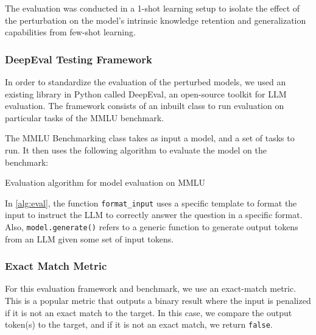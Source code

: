 The evaluation was conducted in a 1-shot learning setup to isolate the effect of the perturbation on the model's intrinsic knowledge retention and generalization capabilities from few-shot learning. 

\subsubsection{DeepEval Testing Framework}
In order to standardize the evaluation of the perturbed models, we used an existing library in Python called DeepEval, an open-source toolkit for LLM evaluation. The framework consists of an inbuilt class to run evaluation on particular tasks of the MMLU benchmark. 

The MMLU Benchmarking class takes as input a model, and a set of tasks to run. It then uses the following algorithm to evaluate the model on the benchmark:
\begin{algorithm}
    \caption{Evaluation algorithm for model evaluation on MMLU}
    \label{alg:eval}
    \SetAlgoLined
\end{algorithm}
In \ref{alg:eval}, the function \verb|format_input| uses a specific template to format the input to instruct the LLM to correctly answer the question in a specific format. Also, \verb|model.generate()| refers to a generic function to generate output tokens from an LLM given some set of input tokens. 

\subsubsection{Exact Match Metric}
For this evaluation framework and benchmark, we use an exact-match metric. This is a popular metric that outputs a binary result where the input is penalized if it is not an exact match to the target. In this case, we compare the output token(s) to the target, and if it is not an exact match, we return \verb|false|.



